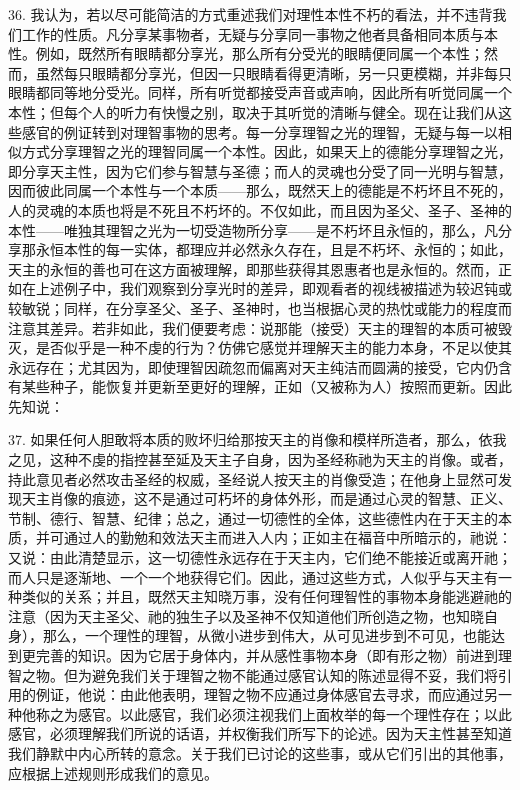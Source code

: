 36. 我认为，若以尽可能简洁的方式重述我们对理性本性不朽的看法，并不违背我们工作的性质。凡分享某事物者，无疑与分享同一事物之他者具备相同本质与本性。例如，既然所有眼睛都分享光，那么所有分受光的眼睛便同属一个本性；然而，虽然每只眼睛都分享光，但因一只眼睛看得更清晰，另一只更模糊，并非每只眼睛都同等地分受光。同样，所有听觉都接受声音或声响，因此所有听觉同属一个本性；但每个人的听力有快慢之别，取决于其听觉的清晰与健全。现在让我们从这些感官的例证转到对理智事物的思考。每一分享理智之光的理智，无疑与每一以相似方式分享理智之光的理智同属一个本性。因此，如果天上的德能分享理智之光，即分享天主性，因为它们参与智慧与圣德；而人的灵魂也分受了同一光明与智慧，因而彼此同属一个本性与一个本质——那么，既然天上的德能是不朽坏且不死的，人的灵魂的本质也将是不死且不朽坏的。不仅如此，而且因为圣父、圣子、圣神的本性——唯独其理智之光为一切受造物所分享——是不朽坏且永恒的，那么，凡分享那永恒本性的每一实体，都理应并必然永久存在，且是不朽坏、永恒的；如此，天主的永恒的善也可在这方面被理解，即那些获得其恩惠者也是永恒的。然而，正如在上述例子中，我们观察到分享光时的差异，即观看者的视线被描述为较迟钝或较敏锐；同样，在分享圣父、圣子、圣神时，也当根据心灵的热忱或能力的程度而注意其差异。若非如此，我们便要考虑：说那能（接受）天主的理智的本质可被毁灭，是否似乎是一种不虔的行为？仿佛它感觉并理解天主的能力本身，不足以使其永远存在；尤其因为，即使理智因疏忽而偏离对天主纯洁而圆满的接受，它内仍含有某些种子，能恢复并更新至更好的理解，正如（又被称为人）按照而更新。因此先知说：\par

37. 如果任何人胆敢将本质的败坏归给那按天主的肖像和模样所造者，那么，依我之见，这种不虔的指控甚至延及天主子自身，因为圣经称祂为天主的肖像。或者，持此意见者必然攻击圣经的权威，圣经说人按天主的肖像受造；在他身上显然可发现天主肖像的痕迹，这不是通过可朽坏的身体外形，而是通过心灵的智慧、正义、节制、德行、智慧、纪律；总之，通过一切德性的全体，这些德性内在于天主的本质，并可通过人的勤勉和效法天主而进入人内；正如主在福音中所暗示的，祂说：又说：由此清楚显示，这一切德性永远存在于天主内，它们绝不能接近或离开祂；而人只是逐渐地、一个一个地获得它们。因此，通过这些方式，人似乎与天主有一种类似的关系；并且，既然天主知晓万事，没有任何理智性的事物本身能逃避祂的注意（因为天主圣父、祂的独生子以及圣神不仅知道他们所创造之物，也知晓自身），那么，一个理性的理智，从微小进步到伟大，从可见进步到不可见，也能达到更完善的知识。因为它居于身体内，并从感性事物本身（即有形之物）前进到理智之物。但为避免我们关于理智之物不能通过感官认知的陈述显得不妥，我们将引用的例证，他说：由此他表明，理智之物不应通过身体感官去寻求，而应通过另一种他称之为感官。以此感官，我们必须注视我们上面枚举的每一个理性存在；以此感官，必须理解我们所说的话语，并权衡我们所写下的论述。因为天主性甚至知道我们静默中内心所转的意念。关于我们已讨论的这些事，或从它们引出的其他事，应根据上述规则形成我们的意见。\par

